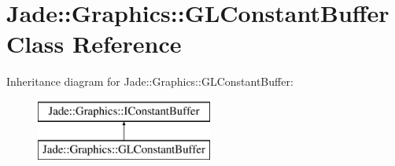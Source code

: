 \hypertarget{class_jade_1_1_graphics_1_1_g_l_constant_buffer}{}\section{Jade\+:\+:Graphics\+:\+:G\+L\+Constant\+Buffer Class Reference}
\label{class_jade_1_1_graphics_1_1_g_l_constant_buffer}
Inheritance diagram for Jade\+:\+:Graphics\+:\+:G\+L\+Constant\+Buffer\+:\begin{figure}[H]
\begin{center}
\leavevmode
\includegraphics[height=2.000000cm]{class_jade_1_1_graphics_1_1_g_l_constant_buffer}
\end{center}
\end{figure}
